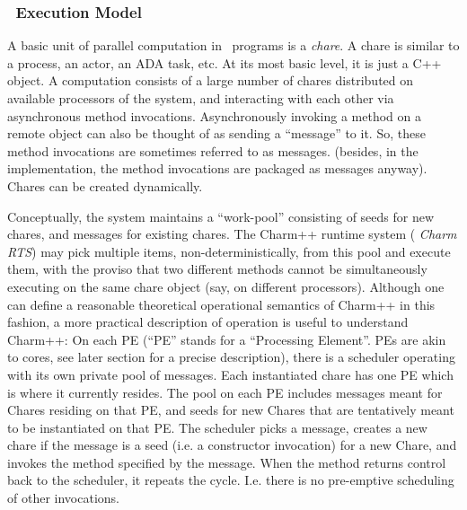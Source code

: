 \subsubsection{\charmpp\ Execution Model}

A basic
unit of parallel computation in \charmpp\ programs is a {\em
chare}. 
A chare is similar to a process, an actor, an ADA task,
etc. At its most basic level, it is just a C++ object.
A \charmpp computation consists of a large number of chares
distributed on available processors of the system, and interacting
with each other via asynchronous method invocations.
Asynchronously invoking a method on a remote object can also be
thought of as
sending a ``message'' to it. So, these method invocations are
sometimes referred to as messages. (besides, in the implementation,
the method invocations are packaged as messages anyway).
Chares can be
created dynamically.

Conceptually, the system maintains a
``work-pool'' consisting of seeds for new chares, and
messages for existing chares. The Charm++ runtime system ({\em
Charm RTS}) may pick multiple items, non-deterministically, from this
pool and execute them, with the proviso that two different methods
cannot be simultaneously executing on the same chare object (say, on
different processors). Although one can define a reasonable
theoretical operational semantics of Charm++ in this fashion, a more
practical description of operation is useful to understand Charm++: On
each PE (``PE'' stands for a ``Processing Element''. PEs are akin to
cores, see later section for a precise description), there is a
scheduler operating with its own private pool of messages. Each
instantiated chare has one PE which is where it currently resides. The
pool on each PE includes messages meant for Chares residing on that
PE, and seeds for new Chares that are tentatively meant to be
instantiated on that PE. The scheduler picks a message, creates a new
chare if the message is a seed (i.e. a constructor invocation) for a
new Chare, and invokes the method specified by the message. When the
method returns control back to the scheduler, it repeats the
cycle. I.e. there is no pre-emptive scheduling of other invocations.

